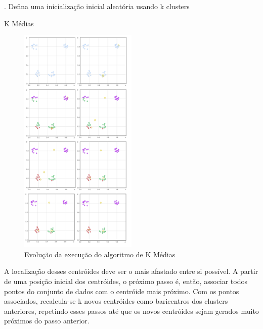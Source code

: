 \begin{algorithm}[H]
. Defina uma inicialização inicial aleatória usando k clusters\;
 \caption{K Médias}
\end{algorithm}

\vspace{5mm}


\begin{figure}[!ht]
\caption{Evolução da execução do algoritmo de K Médias }
\centerline{\includegraphics[width=0.5\textwidth]{img/k-means}}
\end{figure}



A localização desses centróides deve ser o mais afastado entre si possível. A partir de uma posição inicial dos centróides, o próximo passo é, então, associar todos pontos do conjunto de dados com o centróide mais próximo. Com os pontos associados, recalcula-se k novos centróides como baricentros dos clusters anteriores, repetindo esses passos até que os novos centróides sejam gerados muito próximos do passo anterior. 



